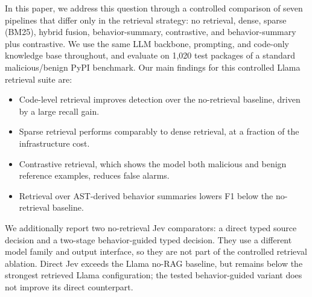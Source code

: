 In this paper, we address this question through a controlled comparison of
seven pipelines that differ only in the retrieval strategy: no retrieval,
dense, sparse (BM25), hybrid fusion, behavior-summary, contrastive, and
behavior-summary plus contrastive. We use the same LLM backbone, prompting,
and code-only knowledge base throughout, and evaluate on 1{,}020 test
packages of a standard malicious/benign PyPI benchmark. Our main findings
for this controlled Llama retrieval suite are:

\begin{itemize}
    \item Code-level retrieval improves detection over the
    no-retrieval baseline, driven by a large recall gain.
    \item Sparse retrieval performs comparably to dense retrieval, at a
    fraction of the infrastructure cost.
    \item Contrastive retrieval, which shows the model both malicious and
    benign reference examples, reduces false alarms.
    \item Retrieval over AST-derived behavior summaries lowers F1 below the
    no-retrieval baseline.
\end{itemize}

We additionally report two no-retrieval Jev comparators: a direct typed
source decision and a two-stage behavior-guided typed decision. They use a
different model family and output interface, so they are not part of the
controlled retrieval ablation. Direct Jev exceeds the Llama no-RAG baseline,
but remains below the strongest retrieved Llama configuration; the tested
behavior-guided variant does not improve its direct counterpart.

\endinput
